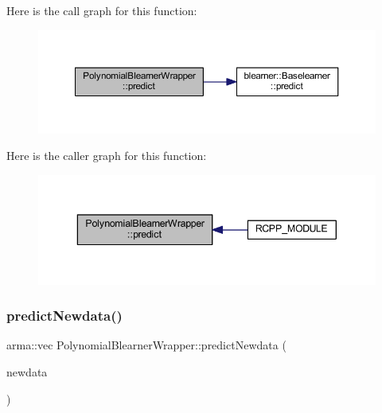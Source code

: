 Here is the call graph for this function\+:\nopagebreak
\begin{figure}[H]
\begin{center}
\leavevmode
\includegraphics[width=350pt]{class_polynomial_blearner_wrapper_a24469ccf334749669dc1ee809263dfb2_cgraph}
\end{center}
\end{figure}
Here is the caller graph for this function\+:\nopagebreak
\begin{figure}[H]
\begin{center}
\leavevmode
\includegraphics[width=343pt]{class_polynomial_blearner_wrapper_a24469ccf334749669dc1ee809263dfb2_icgraph}
\end{center}
\end{figure}
\mbox{\label{class_polynomial_blearner_wrapper_aa3e9670a1e8efe6524e7bdf10a43e25c}} 
\subsubsection{\texorpdfstring{predict\+Newdata()}{predictNewdata()}}
{\footnotesize\ttfamily arma\+::vec Polynomial\+Blearner\+Wrapper\+::predict\+Newdata (\begin{DoxyParamCaption}\item[{\mbox{\hyperlink{class_data_wrapper}{Data\+Wrapper}} \&}]{newdata }\end{DoxyParamCaption})\hspace{0.3cm}{\ttfamily [inline]}}

